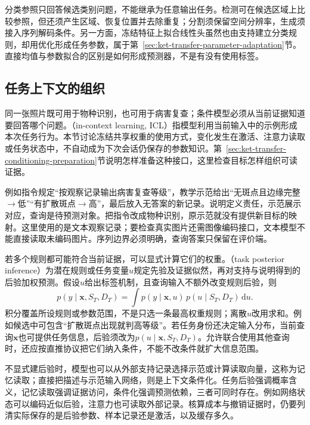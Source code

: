 分类参照只回答候选类别问题，不能继承为任意输出任务。检测可在候选区域上比较参照，但还须产生区域、恢复位置并去除重复；分割须保留空间分辨率，生成须接入序列解码条件。另一方面，冻结特征上拟合线性头虽然也由支持建立分类规则，却用优化形成任务参数，属于第~\ref{sec:ket-transfer-parameter-adaptation}节。直接均值与参数拟合的区别是如何形成预测器，不是有没有使用标签。

\subsection{任务上下文的组织}
\label{sec:ket-transfer-context}

同一张照片既可用于物种识别，也可用于病害复查；条件模型必须从当前证据知道要回答哪个问题。（in-context learning, ICL）指模型利用当前输入中的示例形成本次任务行为。本节讨论冻结共享权重的使用方式，变化发生在激活、注意力读取或任务状态中，不自动成为下次会话仍保存的参数知识。第~\ref{sec:ket-transfer-conditioning-preparation}节说明怎样准备这种接口，这里检查目标怎样组织可读证据。

例如指令规定“按观察记录输出病害复查等级”，教学示范给出“无斑点且边缘完整$\rightarrow$低”“有扩散斑点$\rightarrow$高”，最后放入无答案的新记录。说明定义责任，示范展示对应，查询是待预测对象。把指令改成物种识别，原示范就没有提供新目标的映射。这里使用的是文本观察记录；要检查真实图片还需图像编码接口，文本模型不能直接读取未编码图片。序列边界必须明确，查询答案只保留在评价端。

若多个规则都可能符合当前证据，可以显式计算它们的权重。（task posterior inference）为潜在规则或任务变量$u$规定先验及证据似然，再对支持与说明得到的后验加权预测。假设$u$给出标签机制，且查询输入不额外改变规则后验，则
\begin{equation}
  p(y\mid\bm x,S_T,D_T)
  =\int p(y\mid\bm x,u)\,
          p(u\mid S_T,D_T)\,\mathrm du.
  \label{eq:ket-transfer-task-posterior}
\end{equation}
积分覆盖所设规则或参数范围，不是只选一条最高权重规则；离散$u$改用求和。例如候选中可包含“扩散斑点出现就判高等级”。若任务身份还决定输入分布，当前查询$\bm x$也可提供任务信息，后验须改为$p(u\mid\bm x,S_T,D_T)$。允许联合使用其他查询时，还应按直推协议把它们纳入条件，不能不改条件就扩大信息范围。

不显式建后验时，模型也可以从外部支持记录选择示范或计算读取向量，这称为记忆读取；直接把描述与示范输入网络，则是上下文条件化。任务后验强调概率含义，记忆读取强调证据访问，条件化强调预测依赖，三者可同时存在。例如网络状态可以编码近似后验，注意力也可读取外部记录。核算成本与撤销证据时，仍要列清实际保存的是后验参数、样本记录还是激活，以及缓存多久。


